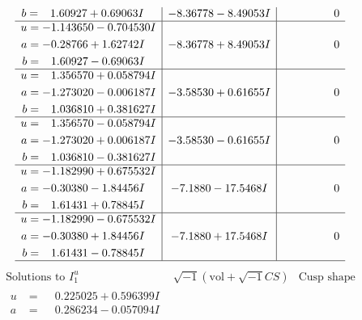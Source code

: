 \documentclass[1p]{elsarticle_modified}
\theoremstyle{definition}
\newcommand{\I}{\sqrt{-1}}
\begin{document}
$$\begin{array}{c|c|c}
\begin{aligned}
b &= \phantom{-}1.60927 + 0.69063 I\end{aligned}
 & -8.36778 - 8.49053 I & \phantom{-0.000000 } 0 \\ \hline\begin{aligned}
u &= -1.143650 - 0.704530 I \\
a &= -0.28766 + 1.62742 I \\
b &= \phantom{-}1.60927 - 0.69063 I\end{aligned}
 & -8.36778 + 8.49053 I & \phantom{-0.000000 } 0 \\ \hline\begin{aligned}
u &= \phantom{-}1.356570 + 0.058794 I \\
a &= -1.273020 - 0.006187 I \\
b &= \phantom{-}1.036810 + 0.381627 I\end{aligned}
 & -3.58530 + 0.61655 I & \phantom{-0.000000 } 0 \\ \hline\begin{aligned}
u &= \phantom{-}1.356570 - 0.058794 I \\
a &= -1.273020 + 0.006187 I \\
b &= \phantom{-}1.036810 - 0.381627 I\end{aligned}
 & -3.58530 - 0.61655 I & \phantom{-0.000000 } 0 \\ \hline\begin{aligned}
u &= -1.182990 + 0.675532 I \\
a &= -0.30380 - 1.84456 I \\
b &= \phantom{-}1.61431 + 0.78845 I\end{aligned}
 & -7.1880 - 17.5468 I & \phantom{-0.000000 } 0 \\ \hline\begin{aligned}
u &= -1.182990 - 0.675532 I \\
a &= -0.30380 + 1.84456 I \\
b &= \phantom{-}1.61431 - 0.78845 I\end{aligned}
 & -7.1880 + 17.5468 I & \phantom{-0.000000 } 0\\
 \hline 
 \end{array}$$\newpage$$\begin{array}{c|c|c}  
\text{Solutions to }I^u_{1}& \I (\text{vol} + \sqrt{-1}CS) & \text{Cusp shape}\\
 \hline 
\begin{aligned}
u &= \phantom{-}0.225025 + 0.596399 I \\
a &= \phantom{-}0.286234 - 0.057094 I \\

\end{aligned}
\end{array}$$
\end{document}
